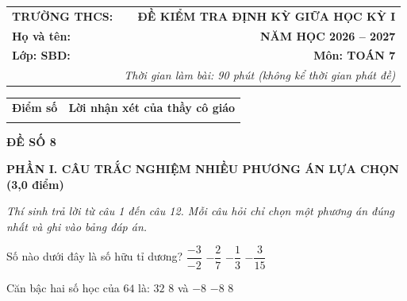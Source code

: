 \documentclass[12pt,a4paper]{article}
\begin{document}
\noindent
\begin{tabularx}{\linewidth}{X r}
\textbf{TRƯỜNG THCS: \dotfill} & \textbf{ĐỀ KIỂM TRA ĐỊNH KỲ GIỮA HỌC KỲ I} \\
\textbf{Họ và tên: \dotfill} & \textbf{NĂM HỌC 2026 -- 2027} \\
\textbf{Lớp: \dotfill \quad SBD: \dotfill} & \textbf{Môn: TOÁN 7} \\
& \textit{Thời gian làm bài: 90 phút (không kể thời gian phát đề)}
\end{tabularx}

\vspace{1mm}
\noindent
\begin{tabularx}{\linewidth}{|p{3.5cm}|X|}
\hline
\centering\textbf{Điểm số} & \centering\textbf{Lời nhận xét của thầy cô giáo} \tabularnewline
\rule{0pt}{1.0cm} & \\
\hline
\end{tabularx}

\vspace{1.5mm}
\begin{center}
\textbf{\large ĐỀ SỐ 8}
\end{center}

\noindent\textbf{\large PHẦN I. CÂU TRẮC NGHIỆM NHIỀU PHƯƠNG ÁN LỰA CHỌN (3,0 điểm)}

\textit{Thí sinh trả lời từ câu 1 đến câu 12. Mỗi câu hỏi chỉ chọn một phương án đúng nhất và ghi vào bảng đáp án.}

\vspace{1mm}
\begin{ex}
Số nào dưới đây là số hữu tỉ dương?
\choice
{\True $\dfrac{-3}{-2}$}
{$-\dfrac{2}{7}$}
{$-\dfrac{1}{3}$}
{$-\dfrac{3}{15}$}
\end{ex}

\begin{ex}
Căn bậc hai số học của $64$ là:
\choice
{$32$}
{$8$ và $-8$}
{$-8$}
{\True $8$}
\end{ex}

\begin{ex}
\end{ex}
\end{document}
